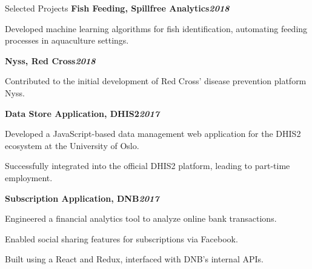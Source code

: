 \begin{rubric}{Selected Projects}
%
\entry*[]%
\textbf{Fish Feeding, Spillfree Analytics\hfill\textit{2018}} \par
    \begin{compactitem}
    \item Developed machine learning algorithms for fish identification, automating feeding processes in aquaculture settings.
    \vspace{-12pt}
\end{compactitem}
%
\entry*[]%
\textbf{Nyss, Red Cross\hfill\textit{2018}} \par
    \begin{compactitem}
    \item Contributed to the initial development of Red Cross' disease prevention platform Nyss.
    \vspace{-12pt}
\end{compactitem}
%
\entry*[]%
\textbf{Data Store Application, DHIS2\hfill\textit{2017}} \par
\begin{compactitem}
    \item Developed a JavaScript-based data management web application for the DHIS2 ecosystem at the University of Oslo.
    \item Successfully integrated into the official DHIS2 platform, leading to part-time employment.
    \vspace{-12pt}
\end{compactitem}
%
\entry*[]%
\textbf{Subscription Application, DNB\hfill\textit{2017}} \par
\begin{compactitem}
    \item Engineered a financial analytics tool to analyze online bank transactions.
    \item Enabled social sharing features for subscriptions via Facebook.
    \item Built using a React and Redux, interfaced with DNB's internal APIs.
    \vspace{-12pt}
\end{compactitem}
%
\end{rubric}